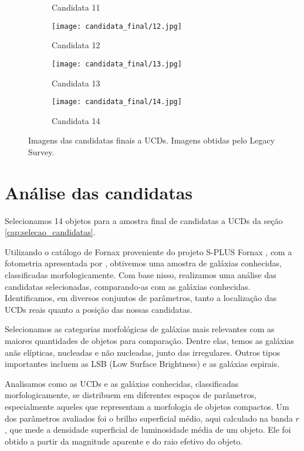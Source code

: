 \begin{figure}[!ht]
\begin{subfigure}[b]{0.25\textwidth}
        \caption{Candidata 11}
    \end{subfigure}
    \begin{subfigure}[b]{0.25\textwidth}
        \texttt{[image: candidata\_final/12.jpg]}
        \caption{Candidata 12}
    \end{subfigure}
    \begin{subfigure}[b]{0.25\textwidth}
        \texttt{[image: candidata\_final/13.jpg]}
        \caption{Candidata 13}
    \end{subfigure}
    \begin{subfigure}[b]{0.25\textwidth}
        \texttt{[image: candidata\_final/14.jpg]}
        \caption{Candidata 14}
    \end{subfigure}
    \caption[]{Imagens das candidatas finais a UCDs. Imagens obtidas pelo Legacy Survey.}
    \label{ucds_candidates_final_imagens}
\end{figure}



\section{Análise das candidatas}\label{sec:analise_candidatas}
Selecionamos 14 objetos para a amostra final de candidatas a UCDs da seção \ref{cap:selecao_candidatas}.

Utilizando o catálogo de Fornax proveniente do projeto S-PLUS Fornax \citep{castelli2024splusfornaxprojectsfp}, com a fotometria apresentada por \citep{haack2024splusfornaxprojectsfp}, obtivemos uma amostra de galáxias conhecidas, classificadas morfologicamente. Com base nisso, realizamos uma análise das candidatas selecionadas, comparando-as com as galáxias conhecidas. Identificamos, em diversos conjuntos de parâmetros, tanto a localização das UCDs reais quanto a posição das nossas candidatas.

Selecionamos as categorias morfológicas de galáxias mais relevantes com as maiores quantidades de objetos para comparação. Dentre elas, temos as galáxias anãs elípticas, nucleadas e não nucleadas, junto das irregulares. Outros tipos importantes incluem as LSB (Low Surface Brightness) e as galáxias espirais.

Analisamos como as UCDs e as galáxias conhecidas, classificadas morfologicamente, se distribuem em diferentes espaços de parâmetros, especialmente aqueles que representam a morfologia de objetos compactos. Um dos parâmetros avaliados foi o brilho superficial médio, aqui calculado na banda $r$, que mede a densidade superficial de luminosidade média de um objeto. Ele foi obtido a partir da magnitude aparente e do raio efetivo do objeto.

